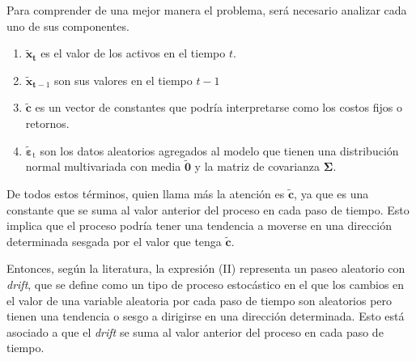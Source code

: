 \begin{problema}
\begin{enumerate}
\begin{sol}
        Para comprender de una mejor manera el problema, será necesario analizar cada uno de sus componentes. 
        \begin{enumerate}
            \item $\tilde{\boldsymbol{x}}_{\mathbf{t}}$ es el valor de los activos en el tiempo $t$.
            \item $\tilde{\boldsymbol{x}}_{\mathbf{t}-1}$ son sus valores en el tiempo $t-1$
            \item  $\tilde{\boldsymbol{c}}$ es un vector de constantes que podría interpretarse como los costos fijos o retornos. 
            \item $\tilde{\boldsymbol{\varepsilon}}_{\mathrm{t}}$ son los datos aleatorios agregados al modelo que tienen una distribución normal multivariada con media $\tilde{\mathbf{0}}$ y la matriz de covarianza $\boldsymbol{\Sigma}$. 
        \end{enumerate}

        De todos estos términos, quien llama más la atención es $\tilde{\boldsymbol{c}}$, ya que es una constante que se suma al valor anterior del proceso en cada paso de tiempo. Esto implica que el proceso podría tener una tendencia a moverse en una dirección determinada sesgada por el valor que tenga $\tilde{\boldsymbol{c}}$.\bigbreak
        
        Entonces, según la literatura, la expresión (II) representa un paseo aleatorio con \textit{drift}, que se define como un tipo de proceso estocástico en el que los cambios en el valor de una variable aleatoria por cada paso de tiempo son aleatorios pero tienen una tendencia o sesgo a dirigirse en una dirección determinada. Esto está asociado a que el \textit{drift} se suma al valor anterior del proceso en cada paso de tiempo.\bigbreak 


\end{sol}
\end{enumerate}
\end{problema}

